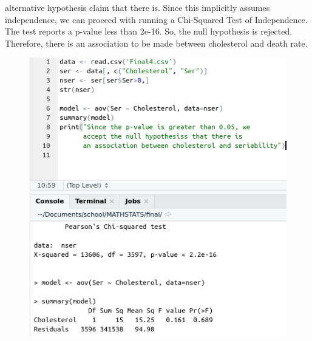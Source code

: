 \documentclass[12pt]{article}
\begin{document}
\begin{enumerate}
		alternative hypothesis claim that there is. Since this implicitly assumes independence, we can proceed 
		with running a Chi-Squared Test of Independence. The test reports a p-value less than 2e-16. So, the null 
		hypothesis is rejected. Therefore, there is an association to be made between cholesterol and death rate.
	\begin{figure}[!h]
		\centering
		\includegraphics[width=\linewidth]{p5-p2.png}
	\end{figure}
\end{enumerate}
\end{document}
